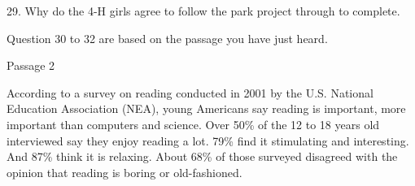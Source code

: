 \documentclass[12pt]{article}
\begin{document}
\vspace{0.00mm}
\setlength{\parindent}{0.00mm}
\setlength{\leftskip}{-6.23mm}
\setlength{\rightskip}{0.00mm}

29. Why do the 4-H girls agree to follow the park project through to complete.
\vspace{0.00mm}

\vspace{0.00mm}
\setlength{\parindent}{0.00mm}
\setlength{\leftskip}{-6.23mm}
\setlength{\rightskip}{0.00mm}


\vspace{0.00mm}

\vspace{0.00mm}
\setlength{\parindent}{0.00mm}
\setlength{\leftskip}{-6.23mm}
\setlength{\rightskip}{0.00mm}

Question 30 to 32 are based on the passage you have just heard.
\vspace{0.00mm}

\vspace{0.00mm}
\setlength{\parindent}{0.00mm}
\setlength{\leftskip}{-6.23mm}
\setlength{\rightskip}{0.00mm}


\vspace{0.00mm}

\vspace{0.00mm}
\setlength{\parindent}{0.00mm}
\setlength{\leftskip}{-6.23mm}
\setlength{\rightskip}{0.00mm}

Passage 2
\vspace{0.00mm}

\vspace{0.00mm}
\setlength{\parindent}{0.00mm}
\setlength{\leftskip}{-6.23mm}
\setlength{\rightskip}{0.00mm}


\vspace{0.00mm}

\vspace{0.00mm}
\setlength{\parindent}{0.00mm}
\setlength{\leftskip}{-6.23mm}
\setlength{\rightskip}{0.00mm}

According to a survey on reading conducted in 2001 by the U.S. National Education Association (NEA), young Americans say reading is important, more important than computers and science. Over 50\% of the 12 to 18 years old interviewed say they enjoy reading a lot. 79\% find it stimulating and interesting. And 87\% think it is relaxing. About 68\% of those surveyed disagreed with the opinion that reading is    boring or old-fashioned.
\vspace{0.00mm}
\end{document}
